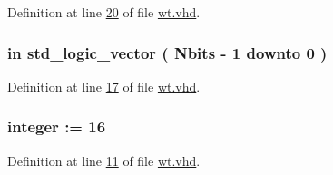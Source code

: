 Definition at line \hyperlink{wt_8vhd_source_l00020}{20} of file \hyperlink{wt_8vhd_source}{wt.\+vhd}.

\hypertarget{classwt_aee4ab8d7344759fe51ddf58734fd8b17}{}
\subsubsection[{M\+A\+X}]{ {\bfseries \textcolor{keywordflow}{in}\textcolor{vhdlchar}{ }} {\bfseries \textcolor{comment}{std\+\_\+logic\+\_\+vector}\textcolor{vhdlchar}{ }\textcolor{vhdlchar}{(}\textcolor{vhdlchar}{ }\textcolor{vhdlchar}{ }\textcolor{vhdlchar}{ }\textcolor{vhdlchar}{ }{\bfseries {\bf Nbits}} \textcolor{vhdlchar}{-\/}\textcolor{vhdlchar}{ } \textcolor{vhdldigit}{1} \textcolor{vhdlchar}{ }\textcolor{keywordflow}{downto}\textcolor{vhdlchar}{ }\textcolor{vhdlchar}{ } \textcolor{vhdldigit}{0} \textcolor{vhdlchar}{ }\textcolor{vhdlchar}{)}\textcolor{vhdlchar}{ }} \hspace{0.3cm}{\ttfamily [Port]}}\label{classwt_aee4ab8d7344759fe51ddf58734fd8b17}


Definition at line \hyperlink{wt_8vhd_source_l00017}{17} of file \hyperlink{wt_8vhd_source}{wt.\+vhd}.

\hypertarget{classwt_a8b45761acb3f2e683677c4eb77d442b0}{}
\subsubsection[{Nbits}]{ {\bfseries \textcolor{vhdlchar}{ }} {\bfseries \textcolor{comment}{integer}\textcolor{vhdlchar}{ }\textcolor{vhdlchar}{ }\textcolor{vhdlchar}{\+:}\textcolor{vhdlchar}{=}\textcolor{vhdlchar}{ }\textcolor{vhdlchar}{ } \textcolor{vhdldigit}{16} \textcolor{vhdlchar}{ }} \hspace{0.3cm}{\ttfamily [Generic]}}\label{classwt_a8b45761acb3f2e683677c4eb77d442b0}


Definition at line \hyperlink{wt_8vhd_source_l00011}{11} of file \hyperlink{wt_8vhd_source}{wt.\+vhd}.

\hypertarget{classwt_a44ef009b7a1d3a2266fd763d872c2b76}{}
